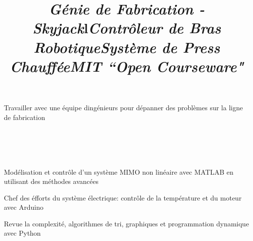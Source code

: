 \documentclass[mm]{res}
\begin{document}
\begin{resume}
\title{\textsl{G\'enie de Fabrication - Skyjack}}
\begin{position}
\tb Travailler avec une \'equipe d\textquotesingle ing\'enieurs pour d\'epanner des probl\`emes sur la ligne de fabrication
\end{position}


\toprule

\section{\headingprojects}
\begin{format}
\title{l}\\
\body\\
\end{format}


\title{\textsl{Contr\^oleur de Bras Robotique}}
\begin{position}
\tb Mod\'elisation et contr\^ole d'un syst\`eme MIMO non lin\'eaire avec MATLAB en utilisant des m\'ethodes avanc\'ees
\end{position}

\title{\textsl{Syst\`eme de Press Chauff\'ee}}
\begin{position}
\tb Chef des \'efforts du syst\`eme \'electrique: contr\^ole de la temp\'erature et du moteur avec Arduino
\end{position}

\title{\textsl{MIT ``Open Courseware"}}
\begin{position}
\tb Revue la complexit\'e, algorithmes de tri, graphiques et programmation dynamique avec Python
\end{position}


\end{resume}
\end{document}
